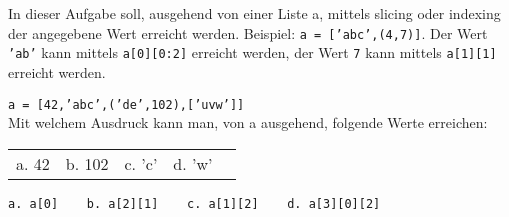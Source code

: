 \question[4]
In dieser Aufgabe soll, ausgehend von einer Liste a, mittels slicing oder
indexing der angegebene Wert erreicht werden.
Beispiel: \texttt{a = ['abc',(4,7)]}.
 Der Wert \texttt{'ab'} kann mittels \texttt{a[0][0:2]} erreicht werden, der Wert
\texttt{7} kann mittels \texttt{a[1][1]} erreicht werden.

\texttt{a = [42,'abc',('de',102),['uvw']]} \\
Mit welchem Ausdruck kann man, von a ausgehend, folgende Werte erreichen:   \\
\begin{tabular}{lllll}
a. 42 & b. 102 & c. 'c' & d. 'w' \\
\end{tabular}
\begin{solutionbox}{1cm}
\texttt{a. a[0] ~~ b. a[2][1] ~~ c. a[1][2] ~~ d. a[3][0][2]}
\end{solutionbox}
